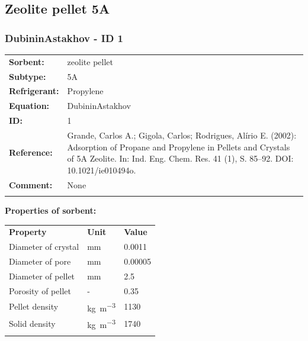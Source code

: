 \subsection{Zeolite pellet 5A}
%
\subsubsection{DubininAstakhov - ID 1}
%
\begin{tabular}[l]{|lp{11.5cm}|}
\hline
\addlinespace

\textbf{Sorbent:} & zeolite pellet \\
\textbf{Subtype:} & 5A \\
\textbf{Refrigerant:} & Propylene \\
\textbf{Equation:} & DubininAstakhov \\
\textbf{ID:} & 1 \\
\textbf{Reference:} & Grande, Carlos A.; Gigola, Carlos; Rodrigues, Alírio E. (2002): Adsorption of Propane and Propylene in Pellets and Crystals of 5A Zeolite. In: Ind. Eng. Chem. Res. 41 (1), S. 85–92. DOI: 10.1021/ie010494o. \\
\textbf{Comment:} & None \\

\addlinespace
\hline
\end{tabular}
\newline

\textbf{Properties of sorbent:}
\newline
%
\begin{longtable}[l]{lll}
\toprule
\addlinespace
\textbf{Property} & \textbf{Unit} & \textbf{Value} \\
\addlinespace
\midrule
\endhead
\bottomrule
\endfoot
\bottomrule
\endlastfoot
\addlinespace

Diameter of crystal & \si{\milli\meter} & 0.0011\\
Diameter of pore & \si{\milli\meter} & 0.00005\\
Diameter of pellet & \si{\milli\meter} & 2.5\\
Porosity of pellet & - & 0.35\\
Pellet density & \si{\kilogram\per\cubic\meter} & 1130\\
Solid density & \si{\kilogram\per\cubic\meter} & 1740\\

\addlinespace\end{longtable}

